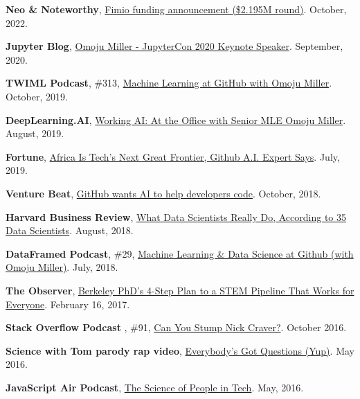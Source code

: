\documentclass[11pt,article,oneside]{memoir}
\begin{document}
\ind \textbf{Neo \& Noteworthy}, \href{https://neo.substack.com/p/neo-and-noteworthy-oct-22-from-workflow}{Fimio funding announcement (\$2.195M round)}. October, 2022.

\ind \textbf{Jupyter Blog}, \href{https://blog.jupyter.org/omoju-miller-435db40d347e}{Omoju Miller - JupyterCon 2020 Keynote Speaker}. September, 2020.

\ind \textbf{TWIML Podcast}, \#313,  \href{https://twimlai.com/podcast/twimlai/machine-learning-github-omoju-miller/}{Machine Learning at GitHub with Omoju Miller}. October, 2019.

\ind \textbf{DeepLearning.AI}, \href{https://www.deeplearning.ai/blog/working-ai-at-the-office-with-senior-mle-omoju-miller/}{Working AI: At the Office with Senior MLE Omoju Miller}. August, 2019.


\ind \textbf{Fortune}, \href{https://fortune.com/2019/07/17/africa-is-techs-next-great-frontier-github-ai/}{Africa Is Tech’s Next Great Frontier, Github A.I. Expert Says}. July, 2019.

\ind \textbf{Venture Beat}, \href{https://venturebeat.com/ai/github-wants-ai-to-help-developers-code/}{GitHub wants AI to help developers code}. October, 2018.

\ind \textbf{Harvard Business Review}, \href{https://hbr.org/2018/08/what-data-scientists-really-do-according-to-35-data-scientists}{What Data Scientists Really Do, According to 35 Data Scientists}. August, 2018.

\ind \textbf{DataFramed Podcast}, \#29, \href{https://www.datacamp.com/community/podcast/machine-learning-github}{Machine Learning \& Data Science at Github (with Omoju Miller)}. July, 2018.

\ind \textbf{The Observer}, \href{http://observer.com/2017/02/omoju-miller-etsy-stem-pipeline/}{Berkeley PhD's 4-Step Plan to a STEM Pipeline That Works for Everyone}. February 16, 2017.

\ind \textbf{Stack Overflow Podcast }, \#91, \href{https://soundcloud.com/stack-exchange/stack-overflow-podcast-91-can-you-stump-nick-craver}{Can You Stump Nick Craver?}. October 2016.

\ind \textbf{Science with Tom parody rap video}, \href{https://www.youtube.com/watch?v=q5mmE05e82I&ab_channel=ScienceWithTom}{Everybody's Got Questions (Yup)}. May 2016.

\ind \textbf{JavaScript Air Podcast}, \href{http://audio.javascriptair.com/e/022-jsair-the-science-of-people-in-tech-with-kate-edwards-omoju-miller-and-steve-andrews/}{The Science of People in Tech}. May, 2016.
\end{document}
